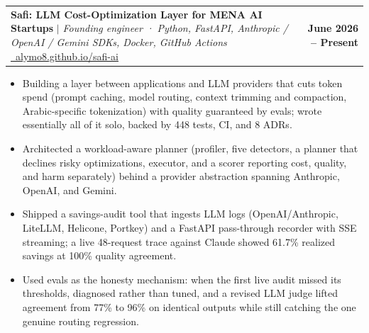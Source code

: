 \documentclass[letterpaper,11pt]{article}
\makeatletter
\newcommand{\resumeItem}[1]{
  \item\small{{#1 \vspace{-2pt}}}
}
\newcommand{\resumeProjectHeading}[2]{
    \item
    \begin{tabular*}{1.001\textwidth}{@{}>{\raggedright\arraybackslash}p{0.80\textwidth}@{\extracolsep{\fill}}r@{}}
      \small#1 & \textbf{\small #2}\\
    \end{tabular*}\vspace{-7pt}
}
\newcommand{\resumeItemListStart}{\begin{itemize}}
\newcommand{\resumeItemListEnd}{\end{itemize}\vspace{-5pt}}
\makeatother
\begin{document}
      \resumeProjectHeading
        {\textbf{Safi: LLM Cost-Optimization Layer for MENA AI Startups} $|$ \emph{Founding engineer · Python, FastAPI, Anthropic / OpenAI / Gemini SDKs, Docker, GitHub Actions} \href{https://alymo8.github.io/safi-ai/}{\raisebox{-0.2\height}\ \underline{alymo8.github.io/safi-ai}}}{June 2026 -- Present}
        \resumeItemListStart
          \resumeItem{Building a layer between applications and LLM providers that cuts token spend (prompt caching, model routing, context trimming and compaction, Arabic-specific tokenization) with quality guaranteed by evals; wrote essentially all of it solo, backed by 448 tests, CI, and 8 ADRs.}
          \resumeItem{Architected a workload-aware planner (profiler, five detectors, a planner that declines risky optimizations, executor, and a scorer reporting cost, quality, and harm separately) behind a provider abstraction spanning Anthropic, OpenAI, and Gemini.}
          \resumeItem{Shipped a savings-audit tool that ingests LLM logs (OpenAI/Anthropic, LiteLLM, Helicone, Portkey) and a FastAPI pass-through recorder with SSE streaming; a live 48-request trace against Claude showed 61.7\% realized savings at 100\% quality agreement.}
          \resumeItem{Used evals as the honesty mechanism: when the first live audit missed its thresholds, diagnosed rather than tuned, and a revised LLM judge lifted agreement from 77\% to 96\% on identical outputs while still catching the one genuine routing regression.}
        \resumeItemListEnd
        \vspace{-13pt}
\end{document}
